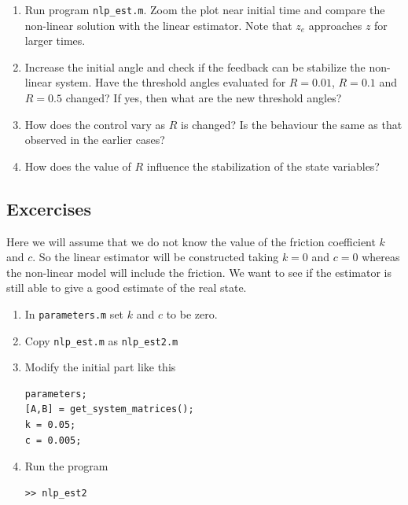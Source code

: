 \documentclass[12pt]{article}
\begin{document}
\begin{enumerate}

\item Run program {\tt nlp\_est.m}. Zoom the plot near initial time and compare the non-linear solution with the linear estimator. Note that $z_e$ approaches $z$ for larger times.

\item Increase the initial angle and check if the feedback can be stabilize the non-linear system. Have the threshold angles evaluated for $R=0.01$, $R=0.1$ and $R=0.5$ changed? If yes, then what are the new threshold angles?

\item How does the control vary as $R$ is changed? Is the behaviour the same as that observed in the earlier cases?

\item How does the value of $R$ influence the stabilization of the state variables?

\end{enumerate}
\subsection{Excercises}
Here we will assume that we do not know the value of the friction coefficient $k$ and $c$. So the linear estimator will be constructed taking $k=0$ and $c=0$ whereas the non-linear model will include the friction. We want to see if the estimator is still able to give a good estimate of the real state.
\begin{enumerate}

\item In {\tt parameters.m} set $k$ and $c$ to be zero.

\item Copy {\tt nlp\_est.m} as {\tt nlp\_est2.m}

\item Modify the initial part like this
\begin{lstlisting}
parameters;
[A,B] = get_system_matrices();
k = 0.05;
c = 0.005;
\end{lstlisting}

\item Run the program
\begin{lstlisting}
>> nlp_est2
\end{lstlisting}

\end{enumerate}
\end{document}
